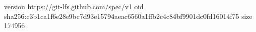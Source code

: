 version https://git-lfs.github.com/spec/v1
oid sha256:c3b1ca1f6e28e9bc7d93e15794aeac6560a1ffb2c4c84bf9901dc0fd16014f75
size 174956
